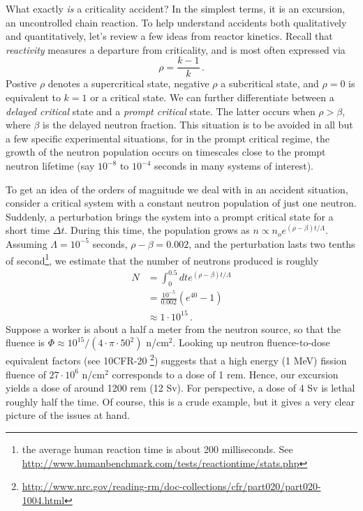 What exactly \textit{is} a criticality accident?  In the simplest terms,
it is an excursion, an uncontrolled chain reaction.  To help understand
accidents
both qualitatively and quantitatively, let's review a few ideas from
reactor kinetics.  Recall that \textit{reactivity} measures a departure
from criticality, and is most often expressed via
\begin{equation}
 \rho = \frac{k-1}{k} \, .
\end{equation}
Postive $\rho$ denotes a supercritical state, negative $\rho$ a 
subcritical state, and $\rho = 0$ is equivalent to $k=1$ or a 
critical state.  We can further differentiate between a \textit{delayed
critical} state and a \textit{prompt critical} state.  The latter 
occurs when $\rho > \beta$, where $\beta$ is the delayed neutron
fraction.  This situation is to be avoided in all but a few specific
experimental situations, for in the prompt critical regime, 
the growth of the neutron population occurs on timescales close
to the prompt neutron lifetime (say $10^{-8}$ to $10^{-4}$ seconds in many
systems of interest).  

To get an idea of the orders of magnitude we deal with in an accident
situation, consider a critical system with a constant neutron population
of just one neutron.  Suddenly, a perturbation brings the system
into a prompt critical state for a short time $\Delta t$.  During this
time, the population grows as $n \propto n_o e^{(\rho-\beta)t/\Lambda}$.  
Assuming $\Lambda = 10^{-5}$ seconds, $\rho-\beta = 0.002$, and the perturbation 
lasts two tenths of second\footnote{the average human reaction time is
about 200 milliseconds. 
See \url{http://www.humanbenchmark.com/tests/reactiontime/stats.php}}, 
we estimate that the number of neutrons produced is 
roughly
\begin{equation}
\begin{split}
 N &= \int^{0.5}_0 dt e^{(\rho-\beta)t/\Lambda} \\
   &= \frac{10^{-5}}{0.002} (e^{40} - 1) \\
   &\approx 1 \cdot 10^{15} \, .
\end{split}
\end{equation}
Suppose a worker is about a half a meter from the neutron source, so that
the fluence is $\Phi \approx 10^{15} / (4\cdot \pi \cdot 50^2)$ n/cm$^2$.
Looking up neutron fluence-to-dose equivalent factors (see 10CFR-20
\footnote{\url{http://www.nrc.gov/reading-rm/doc-collections/cfr/part020/part020-1004.html}}) 
suggests
that a high energy (1 MeV) fission fluence of $27\cdot 10^6$  n/cm$^2$
corresponds
to a dose of 1 rem.  Hence, our excursion yields a dose of around
1200 rem (12 Sv).  For perspective, a dose of 4 Sv is lethal roughly 
half the time.  Of course, this is a crude example, but it gives a 
very clear picture of the issues at hand.

